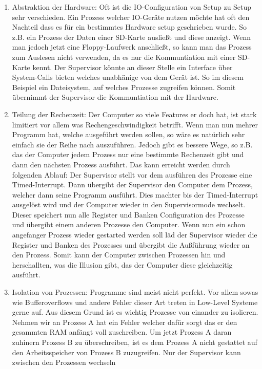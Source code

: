 \documentclass{scrartcl}
\begin{document}
    \begin{enumerate}
        \item Abstraktion der Hardware: Oft ist die IO-Configuration von Setup zu Setup sehr verschieden. Ein Prozess welcher IO-Geräte nutzen möchte hat oft den Nachteil dass es für ein bestimmtes Hardware setup geschrieben wurde. So z.B. ein Prozess der Daten einer SD-Karte ausließt und diese anzeigt. Wenn man jedoch jetzt eine Floppy-Laufwerk anschließt, so kann man das Prozess zum Auslesen nicht verwenden, da es nur die Kommuntiation mit einer SD-Karte kennt. Der Supervisor könnte an dieser Stelle ein Interface über System-Calls bieten welches unabhänige von dem Gerät ist. So im diesem Beispiel ein Dateisystem, auf welches Prozesse zugreifen können. Somit übernimmt der Supervisor die Kommuntiation mit der Hardware.

        \item Teilung der Rechenzeit: Der Computer so viele Features er doch hat, ist stark limitiert vor allem was Rechengeschwindigkeit betrifft. Wenn man nun mehrer Programm hat, welche ausgeführt werden sollen, so wäre es natürlich sehr einfach sie der Reihe nach auszuführen. Jedoch gibt es bessere Wege, so z.B. das der Computer jedem Prozess nur eine bestimmte Rechenzeit gibt und dann den nächsten Prozess ausführt. Das kann erreicht werden durch folgenden Ablauf: Der Supervisor stellt vor dem ausführen des Prozesse eine Timed-Interrupt. Dann übergibt der Supervisor den Computer dem Prozess, welcher dann seine Programm ausführt. Dies machter bis der Timed-Interrupt ausgelöst wird und der Computer wieder in den Supervisormode wechselt. Dieser speichert nun alle Register und Banken Configuration des Prozesse und übergibt einem anderen Prozesse den Computer. Wenn nun ein schon angefanger Prozess wieder gestarted werden soll läd der Supervisor wieder die Register und Banken des Prozesses und übergibt die Außführung wieder an den Prozess. Somit kann der Computer zwischen Prozessen hin und herschallten, was die Illusion gibt, das der Computer diese gleichzeitig ausführt.

        \item Isolation von Prozessen: Programme sind meist nicht perfekt. Vor allem sowas wie Bufferoverflows und andere Fehler dieser Art treten in Low-Level Systeme gerne auf. Aus diesem Grund ist es wichtig Prozesse von einander zu isolieren. Nehmen wir an Prozess A hat ein Fehler welcher dafür sorgt das er den gesammten RAM anfängt voll zuschreiben. Um jetzt Prozess A daran zuhinern Prozess B zu überschreiben, ist es dem Prozess A nicht gestattet auf den Arbeitsspeicher von Prozess B zuzugreifen. Nur der Supervisor kann zwischen den Prozessen wechseln
    \end{enumerate}
\end{document}
